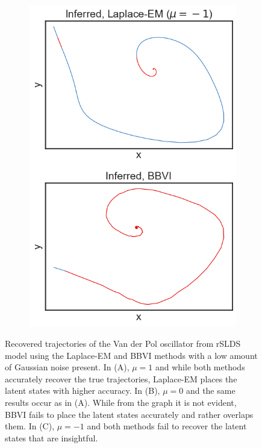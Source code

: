 \begin{figure}
\begin{subfigure}[b]{0.33\linewidth}
        \includegraphics[width=\linewidth]{./Figures/vdp-good-mu-1.png}
        \caption{}
        \label{goodvdp:c}
        \vspace{4ex}
    \end{subfigure}
    \caption{Recovered trajectories of the Van der Pol oscillator from rSLDS model using the Laplace-EM and BBVI methods with a low amount of Gaussian noise present. In (A), $\mu = 1$ and while both methods accurately recover the true trajectories, Laplace-EM places the latent states with higher accuracy. In (B), $\mu = 0$ and the same results occur as in (A). While from the graph it is not evident, BBVI fails to place the latent states accurately and rather overlaps them. In (C), $\mu = -1$ and both methods fail to recover the latent states that are insightful.}
    \label{goodvdp}
\end{figure}



